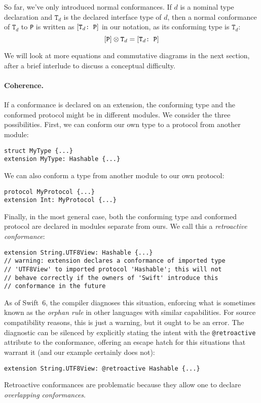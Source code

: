 \documentclass[../generics]{subfiles}
\begin{document}
\newcommand{\NormalConf}{\ConfReq{$\texttt{T}_d$}{P}}

So far, we've only introduced normal conformances. If $d$ is a nominal type declaration and $\texttt{T}_d$ is the declared interface type of $d$, then a normal conformance of $\texttt{T}_d$ to \texttt{P} is written as $\NormalConf$ in our notation, as its conforming type is $\texttt{T}_d$:
\[\protosym{P}\otimes\texttt{T}_d=\NormalConf\]

We will look at more equations and commutative diagrams in the next section, after a brief interlude to discuss a conceptual difficulty.

\paragraph{Coherence.} If a conformance is declared on an extension, the conforming type and the conformed protocol might be in different modules. We consider the three possibilities. First, we can conform our own type to a protocol from another module:
\begin{Verbatim}
struct MyType {...}
extension MyType: Hashable {...}
\end{Verbatim}
We can also conform a type from another module to our own protocol:
\begin{Verbatim}
protocol MyProtocol {...}
extension Int: MyProtocol {...}
\end{Verbatim}
Finally, in the most general case, both the conforming type and conformed protocol are declared in modules separate from ours. We call this a \emph{retroactive conformance}:
\begin{Verbatim}
extension String.UTF8View: Hashable {...}
// warning: extension declares a conformance of imported type
// 'UTF8View' to imported protocol 'Hashable'; this will not
// behave correctly if the owners of 'Swift' introduce this
// conformance in the future
\end{Verbatim}
As of Swift~6, the compiler diagnoses this situation, enforcing what is sometimes known as the \emph{orphan rule} in other languages with similar capabilities. For source compatibility reasons, this is just a warning, but it ought to be an error. The diagnostic can be silenced by explicitly stating the intent with the \texttt{@retroactive} attribute to the conformance, offering an escape hatch for this situations that warrant it (and our example certainly does not):
\begin{Verbatim}
extension String.UTF8View: @retroactive Hashable {...}
\end{Verbatim}
Retroactive conformances are problematic because they allow one to declare \emph{overlapping conformances}.
\end{document}
